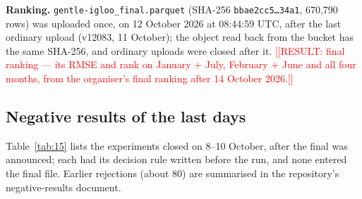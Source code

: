 \documentclass[11pt,a4paper]{article}
\newcommand{\placeholder}[1]{\textcolor{red}{[[RESULT:#1]]}}
\begin{document}
\textbf{Ranking.} \texttt{gentle-igloo\_\allowbreak{}final.parquet} (SHA-256 \texttt{bbae2cc5\ldots{}34a1}, 670,790 rows) was uploaded once, on 12 October 2026 at 08:44:59 UTC, after the last ordinary upload (v12083, 11 October); the object read back from the bucket has the same SHA-256, and ordinary uploads were closed after it. \placeholder{ final ranking --- its RMSE and rank on January + July, February + June and all four months, from the organiser's final ranking after 14 October 2026.}

\subsection{Negative results of the last days}\label{negative-results-of-the-last-days}

Table~\ref{tab:15} lists the experiments closed on 8--10 October, after the final was announced; each had its decision rule written before the run, and none entered the final file. Earlier rejections (about 80) are summarised in the repository's negative-results document.
\end{document}
